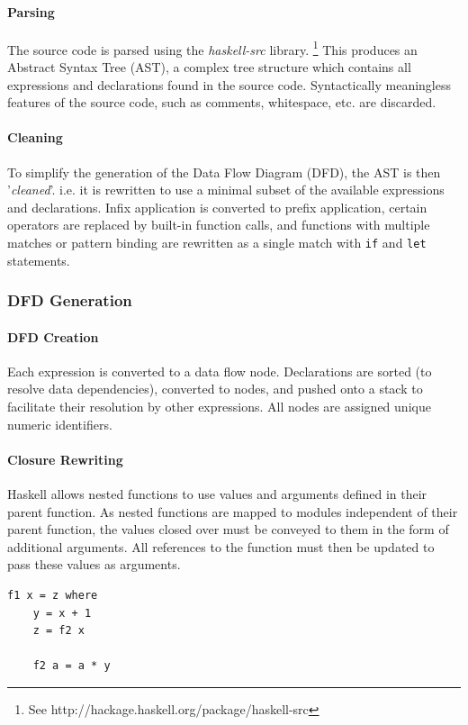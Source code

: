 \documentclass[english,onecolumn]{article}
\begin{document}
\paragraph{Parsing}
The source code is parsed using the \textit{haskell-src} library.%
\footnote{See http://hackage.haskell.org/package/haskell-src}
This produces an Abstract Syntax Tree (AST), a complex tree structure which contains all expressions and declarations found in the source code. Syntactically meaningless features of the source code, such as comments, whitespace, etc. are discarded.

\paragraph{Cleaning}
To simplify the generation of the Data Flow Diagram (DFD), the AST is then '\textit{cleaned}'. i.e. it is rewritten to use a minimal subset of the available expressions and declarations. Infix application is converted to prefix application, certain operators are replaced by built-in function calls, and functions with multiple matches or pattern binding are rewritten as a single match with \lstinline{if} and \lstinline{let} statements.

\subsubsection{DFD Generation}
\paragraph{DFD Creation}
Each expression is converted to a data flow node. Declarations are sorted (to resolve data dependencies), converted to nodes, and pushed onto a stack to facilitate their resolution by other expressions. All nodes are assigned unique numeric identifiers.

\paragraph{Closure Rewriting}
Haskell allows nested functions to use values and arguments defined in their parent function. As nested functions are mapped to modules independent of their parent function, the values closed over must be conveyed to them in the form of additional arguments.
All references to the function must then be updated to pass these values as arguments.

\begin{lstlisting}[caption={A nested function with a closure.}, label=lst:closure]
f1 x = z where
    y = x + 1
    z = f2 x

    f2 a = a * y
\end{lstlisting}
\end{document}
